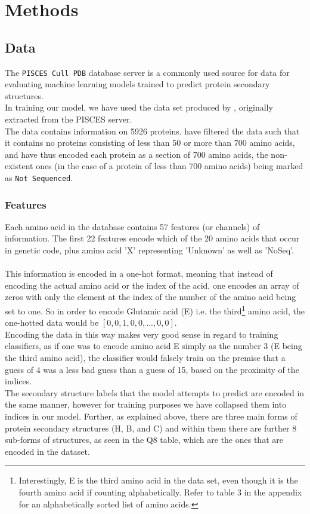 \section{Methods}

\subsection{Data}
The \texttt{PISCES Cull PDB} database server \citep{wang-2003} is a commonly used source for data for evaluating 
machine learning models trained to predict protein secondary structures.\\
In training our model, we have used the data set produced by \cite{zhou-and-troyanskaya-2014}, originally extracted from the PISCES server.\\
The data contains information on 5926 proteins. \citeauthor{zhou-and-troyanskaya-2014} have filtered the data such that it contains no proteins consisting of less than 50 or more than 700 amino acids, and have thus encoded each protein as a section of 700 amino acids, the non-existent ones (in the case of a protein of less than 700 amino acids) being marked as \texttt{Not Sequenced}.

\subsubsection{Features}
Each amino acid in the database contains 57 features (or channels) of information. The first 22 features encode which of the 20 amino acids that occur in genetic code, plus amino acid 'X' representing 'Unknown' as well as 'NoSeq'.\\
\\
This information is encoded in a one-hot format, meaning that instead of encoding the actual amino acid or the index of the acid, one encodes an array of zeros with only the element at the index of the number of the amino acid being set to one. So in order to encode Glutamic acid (E) i.e. the third\footnote{Interestingly, E is the third amino acid in the data set, even though it is the fourth amino acid if counting alphabetically. Refer to table 3 in the appendix for an alphabetically sorted list of amino acids.} amino acid, the one-hotted data would be $[0, 0, 1, 0, 0, ... , 0, 0]$. \\
Encoding the data in this way makes very good sense in regard to training classifiers, as if one was to encode amino acid E simply as the number 3 (E being the third amino acid), the classifier would falsely train on the premise that a guess of 4 was a less bad guess than a guess of 15, based on the proximity of the indices.\\
The secondary structure labels that the model attempts to predict are encoded in the same manner, however for training purposes we have collapsed them into indices in our model. Further, as explained above, there are three main forms of protein secondary structures (H, B, and C) and within them there are further 8 sub-forms of structures, as seen in  the Q8 table, which are the ones that are encoded in the dataset.

